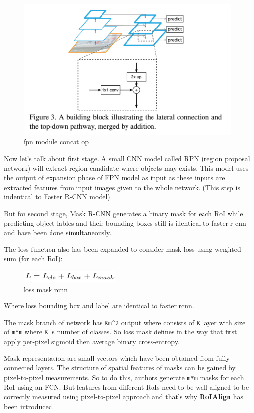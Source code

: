 \documentclass[11pt]{article}
\makeatletter
\def\maxwidth{\ifdim\Gin@nat@width>\linewidth\linewidth
    \else\Gin@nat@width\fi}
\let\Oldincludegraphics\includegraphics
\renewcommand{\includegraphics}[1]{\Oldincludegraphics[width=.8\maxwidth]{#1}}
\makeatother
\begin{document}
\begin{figure}
\centering
\includegraphics{wiki/2_2.png}
\caption{fpn module concat op}
\end{figure}

Now let's talk about first stage. A small CNN model called RPN (region
proposal network) will extract region candidate where objects may
exists. This model uses the output of expansion phase of FPN model as
input as these inputs are extracted features from input images given to
the whole network. (This step is indentical to Faster R-CNN model)

But for second stage, Mask R-CNN generates a binary mask for each RoI
while predicting object lables and their bounding boxes still is
identical to faster r-cnn and have been done simultaneously.

The loss function also has been expanded to consider mask loss using
weighted sum (for each RoI):

\begin{figure}
\centering
\includegraphics{wiki/2_4.png}
\caption{loss mask rcnn}
\end{figure}

Where loss bounding box and label are identical to faster rcnn.

The mask branch of network has \texttt{Km\^{}2} output where consists of
\texttt{K} layer with size of \texttt{m*m} where \texttt{K} is number of
classes. So loss mask defines in the way that first apply per-pixel
sigmoid then average binary cross-entropy.

Mask representation are small vectors which have been obtained from
fully connected layers. The structure of spatial features of masks can
be gained by pixel-to-pixel measurements. So to do this, authors
generate \texttt{m*m} masks for each RoI using an FCN. But features from
different RoIs need to be well aligned to be correctly measured using
pixel-to-pixel approach and that's why \textbf{RoIAlign} has been
introduced.
\end{document}
